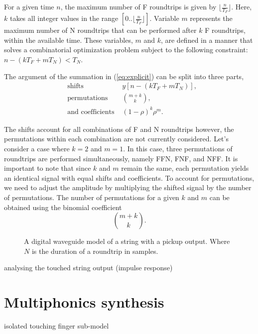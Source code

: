 \documentclass{sigchi}
\begin{document}
For a given time $n$, the maximum number of F roundtrips is given by $\lfloor \frac{n}{T_F} \rfloor$. Here, $k$ takes all integer values in the range $[0..\lfloor \frac{n}{T_F} \rfloor]$. Variable $m$ represents the maximum number of N roundtrips that can be performed after $k$ F roundtrips, within the available time. These variables, $m$ and $k$, are defined in a manner that solves a combinatorial optimization problem subject to the following constraint: $n - (kT_F + mT_N) < T_N$.

The argument of the summation in (\ref{eq:explicit}) can be split into three parts,
\begin{align*}
	&\textrm{shifts } & %
	y[n - (kT_F + mT_N)], \\[1em]
	&\textrm{permutations } &%
	\binom{m+k}{k}, \\[1em]
	&\textrm{and coefficients } &%
	(1 - \rho)^{k} \rho^m.
\end{align*}

The shifts account for all combinations of F and N roundtrips however, the permutations within each combination are not currently considered. Let's consider a case where $k = 2$ and $m = 1$. In this case, three permutations of roundtrips are performed simultaneously, namely FFN, FNF, and NFF. It is important to note that since $k$ and $m$ remain the same, each permutation yields an identical signal with equal shifts and coefficients. To account for permutations, we need to adjust the amplitude by multiplying the shifted signal by the number of permutations. The number of permutations for a given $k$ and $m$ can be obtained using the binomial coefficient
\begin{equation}
	\binom{m+k}{k}.
\end{equation}

\begin{figure}[h]
	\centering
	\scalebox{1}{}
	\caption{A digital waveguide model of a string with a pickup output. Where $N$ is the duration of a roundtrip in samples.}
	\label{fig:triangle}
\end{figure}

analysing the touched string output (impulse response)~\cite{guettler_bowed-string_2012}

\section{Multiphonics synthesis}

isolated touching finger sub-model
\end{document}

